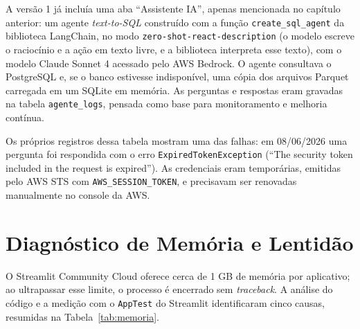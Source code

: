 \documentclass[12pt,a4paper]{report}
\begin{document}
A versão 1 já incluía uma aba ``Assistente IA'', apenas mencionada no capítulo anterior: um
agente \textit{text-to-SQL} construído com a função \texttt{create\_sql\_agent} da
biblioteca LangChain, no modo \texttt{zero-shot-react-description} (o modelo escreve o
raciocínio e a ação em texto livre, e a biblioteca interpreta esse texto), com o modelo
Claude Sonnet 4 acessado pelo AWS Bedrock. O agente consultava o PostgreSQL e, se o banco
estivesse indisponível, uma cópia dos arquivos Parquet carregada em um SQLite em memória.
As perguntas e respostas eram gravadas na tabela \texttt{agente\_logs}, pensada como base
para monitoramento e melhoria contínua.

Os próprios registros dessa tabela mostram uma das falhas: em 08/06/2026 uma pergunta foi
respondida com o erro \texttt{ExpiredTokenException} (``The security token included in
the request is expired''). As credenciais eram temporárias, emitidas pelo AWS STS com
\texttt{AWS\_SESSION\_TOKEN}, e precisavam ser renovadas manualmente no console da AWS.

\section{Diagnóstico de Memória e Lentidão}

O Streamlit Community Cloud oferece cerca de 1 GB de memória por aplicativo; ao
ultrapassar esse limite, o processo é encerrado sem \textit{traceback}. A análise do código
e a medição com o \texttt{AppTest} do Streamlit identificaram cinco causas, resumidas na
Tabela~\ref{tab:memoria}.
\end{document}
